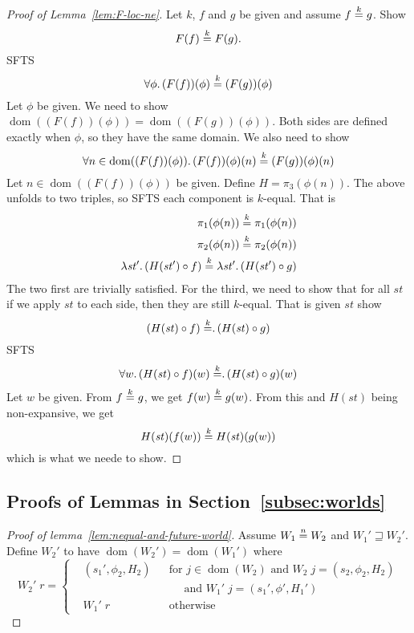 \documentclass{article}
\newcommand{\nequal}[1][n]{\stackrel{\tiny{#1}}{=}}
\DeclareMathOperator{\dom}{dom}
\newcommand{\var}[1]{\mathit{#1}}
\newcommand{\future}{\mathbin{\sqsupseteq}}
\begin{document}
\begin{appendices}
\begin{proof}[Proof of Lemma~\ref{lem:F-loc-ne}]
Let $k$, $f$ and $g$ be given and assume $f \nequal[k] g$. Show
\[
F(f) \nequal[k] F(g).
\]
SFTS
\[
\forall \phi \ldotp (F(f))(\phi) \nequal[k] (F(g))(\phi)
\]
Let $\phi$ be given. We need to show $\dom((F(f))(\phi)) = \dom((F(g))(\phi))$. Both sides are defined exactly when $\phi$, so they have the same domain. We also need to show
\[
\forall n \in \dom((F(f))(\phi))\ldotp (F(f))(\phi)(n) \nequal[k] (F(g))(\phi)(n)
\]
Let $n \in  \dom((F(f))(\phi))$ be given. Define $H = \pi_3 (\phi(n))$. The above unfolds to two triples, so SFTS each component is $k$-equal. That is
\begin{align*}
  \pi_1(\phi(n)) \nequal[k] \pi_1(\phi(n))\\
  \pi_2(\phi(n)) \nequal[k] \pi_2(\phi(n))\\
  \lambda \var{st}'\ldotp (H(\var{st}') \circ f) \nequal[k]   \lambda \var{st}'\ldotp (H(\var{st}') \circ g)
\end{align*}
The two first are trivially satisfied. For the third, we need to show that for all $\var{st}$ if we apply $\var{st}$ to each side, then they are still $k$-equal. That is given $\var{st}$ show
\[
  (H(\var{st}) \circ f) \nequal[k]   \ldotp (H(\var{st}) \circ g)
\]
SFTS
\[
\forall w \ldotp (H(\var{st}) \circ f)(w) \nequal[k]   \ldotp (H(\var{st}) \circ g)(w)
\]
Let $w$ be given. From $f \nequal[k] g$, we get $f(w) \nequal[k] g(w)$. From this and $H(st)$ being non-expansive, we get
\[
  H(\var{st})(f(w)) \nequal[k]   H(\var{st})(g(w))
\]
which is what we neede to show.

\end{proof}
\subsection{Proofs of Lemmas in Section~\ref{subsec:worlds}}
\begin{proof}[Proof of lemma~\ref{lem:nequal-and-future-world}]
  Assume $W_1 \nequal W_2$ and $W_1' \future W_2'$. Define $W_2'$ to have $\dom(W_2')=\dom(W_1')$ where
\[
  W_2' \; r = \left\{
  \begin{aligned}
    & (s_1',\phi_2,H_2) & &\text{for } j \in \dom(W_2) \text{ and } W_2 \; j = (s_2,\phi_2,H_2) \\
    &                  & &\quad \text{ and } W_1' \; j = (s_1',\phi',H_1') \\
    & W_1' \; r        & &\text{otherwise}
  \end{aligned} 
  \right.
\]


\end{proof}
\end{appendices}
\end{document}
